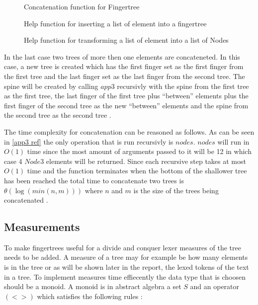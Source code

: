 \begin{figure}[h!]

\caption{Concatenation function for Fingertree \label{fig:concat}\cite{fingertree}}
\end{figure}

\begin{figure}[h!]

\caption{Help function for inserting a list of element into a fingertree
  \label{fig:reduceAppend}\cite{fingertree}}
\end{figure}

\begin{figure}[h!]

\caption{Help function for transforming a list of element into a list of Nodes
  \label{fig:nodesHelp}\cite{fingertree}}
\end{figure}

In the last case two trees of more then one elements
are concateneted. In this case, a new tree is created which has the first
finger set as the first finger from the first tree and the last finger set as
the last finger from the second tree. The spine will be created by calling
$app3$ recursivly with the spine from the first tree as the first tree, the last
finger of the first tree plus ``between'' elements plus the first finger of the
second tree as the new ``between'' elements and the spine from the second tree
as the second tree \cite{fingertree}.

The time complexity for concatenation can be reasoned as follows. As can be seen
in \cref{app3 ref} the only operation that is run recursivly is $nodes$. $nodes$
will run in $O(1)$ time since the most amount of arguments passed to it will be
12 in which case 4 $Node3$ elements will be returned. Since each recursive step
takes at most $O(1)$ time and the function terminates when the bottom of the
shallower tree has been reached the total time to concatenate two trees is
$\theta(\log(min(n,m)))$ where $n$ and $m$ is the size of the trees being
concatenated \cite{fingertree}.

\subsection{Measurements \label{sub:measurement}}
To make fingertrees useful for a divide and conquer lexer measures of the tree
needs to be added. A measure of a tree may for example be how many elements is
in the tree or as will be shown later in the report, the lexed tokens of the
text in a tree. To implement measures time effiecently the data type that is
choosen should be a monoid. A monoid is in abstract algebra a set $S$ and an
operator $(<>)$ which satisfies the following rules \cite{fingertree}:

